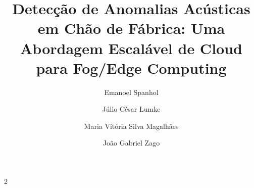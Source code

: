 \documentclass[a4paper,12pt]{article}
\title{Detecção de Anomalias Acústicas em Chão de Fábrica: Uma Abordagem Escalável de Cloud para Fog/Edge Computing}
\author[1]{Emanoel Spanhol}
\author[1]{Júlio César Lumke}
\author[1]{Maria Vitória Silva Magalhães}
\author[1]{João Gabriel Zago}
\affil[1]{Pós-graduação em Inteligência Artificial Aplicada, UniSENAI}
\date{}
\begin{document}
\maketitle

\begin{multicols*}{2}












\end{multicols*}
\end{document}
